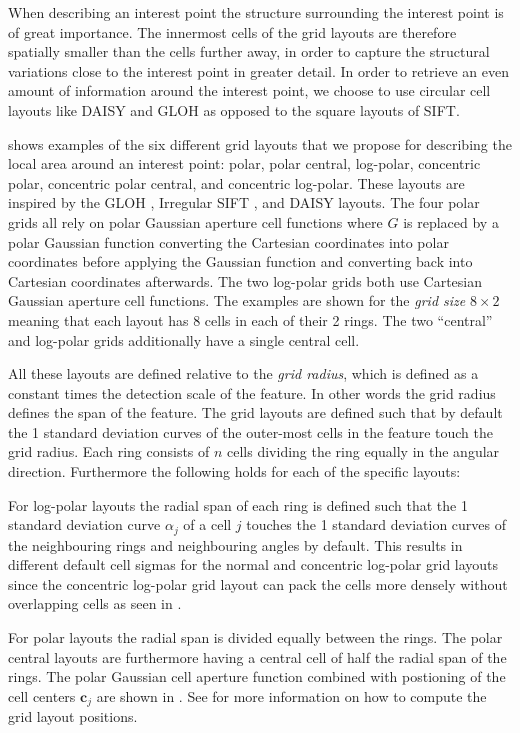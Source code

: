 \documentclass[thesis.tex]{subfiles}
\def\c{\mathbf{c}}
\begin{document}
When describing an interest point the structure surrounding the interest point is of great importance. The innermost cells of the grid layouts are therefore spatially smaller than the cells further away, in order to capture the structural variations close to the interest point in greater detail. In order to retrieve an even amount of information around the interest point, we choose to use circular cell layouts like DAISY and GLOH as opposed to the square layouts of SIFT.

 shows examples of the six different grid layouts that we propose for describing the local area around an interest point: polar, polar central, log-polar, concentric polar, concentric polar central, and concentric log-polar. These layouts are inspired by the GLOH \cite{mikolajczyk2005performance}, Irregular SIFT \cite{cui2009scale}, and DAISY \cite{tola2008fast} layouts. The four polar grids all rely on polar Gaussian aperture cell functions where $G$ is replaced by a polar Gaussian function converting the Cartesian coordinates into polar coordinates before applying the Gaussian function and converting back into Cartesian coordinates afterwards. The two log-polar grids both use Cartesian Gaussian aperture cell functions. The examples are shown for the \emph{grid size} $8\times 2$ meaning that each layout has 8 cells in each of their 2 rings. The two ``central'' and log-polar grids additionally have a single central cell.

All these layouts are defined relative to the \emph{grid radius}, which is defined as a constant times the detection scale of the feature. In other words the grid radius defines the span of the feature. The grid layouts are defined such that by default the 1 standard deviation curves of the outer-most cells in the feature touch the grid radius. Each ring consists of $n$ cells dividing the ring equally in the angular direction. Furthermore the following holds for each of the specific layouts:

For log-polar layouts the radial span of each ring is defined such that the 1 standard deviation curve $\alpha_j$ of a cell $j$ touches the 1 standard deviation curves of the neighbouring rings and neighbouring angles by default. This results in different default cell sigmas for the normal and concentric log-polar grid layouts since the concentric log-polar grid layout can pack the cells more densely without overlapping cells as seen in .

For polar layouts the radial span is divided equally between the rings. The polar central layouts are furthermore having a central cell of half the radial span of the rings. The polar Gaussian cell aperture function combined with postioning of the cell centers $\c_j$ are shown in .
See  for more information on how to compute the grid layout positions.
\end{document}
